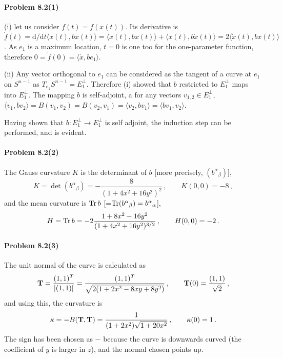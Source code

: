 \documentclass[a4paper,12pt]{article}
\def\d{\mathrm{d}}
\def\Tr{\ensuremath{\mathop{\rm Tr}}}
\newcommand{\problem}[1]{\paragraph{Problem #1}}
\begin{document}

\problem{8.2(1)} (i) let us consider $f(t)=f(x(t))$. Its derivative is $\dot{f}(t) = \d/\d t \langle x(t), b x(t)\rangle = \langle \dot{x}(t), b x(t)\rangle + \langle x(t), b\dot{x}(t)\rangle = 2\langle\dot{x}(t), bx(t)\rangle$. As $e_1$ is a maximum location, $t=0$ is one too for the one-parameter function, therefore $0 = \dot{f}(0) = \langle \dot{x}, be_1\rangle$.

(ii) Any vector orthogonal to $e_1$ can be considered as the tangent of a curve at $e_1$ on $S^{n-1}$ as $T_{e_1}S^{n-1} = E_1^\perp$. Therefore (i) showed that $b$ restricted to $E_1^\perp$ maps into $E_1^\perp$. 
The mapping $b$ is self-adjoint, a for any vectors $v_{1,2}\in E_1^\perp$, $\langle v_1, bv_2\rangle = B(v_1, v_2) = B(v_2, v_1) = \langle v_2, bv_1\rangle = \langle bv_1, v_2\rangle$.

Having shown that $b:E_1^\perp\to E_1^\perp$ is self adjoint, the induction step can be performed, and is evident.


\problem{8.2(2)} The Gauss curvature $K$ is the determinant of $b$ [more precisely, $(b^\alpha{}_\beta)$],
\[
 K = \det (b^\alpha{}_\beta) = -\frac{8}{(1+4x^2+16y^2)^2}\,,\quad\quad K(0, 0) = -8\,,
\]
and the mean curvature is $\Tr b$ [=$\Tr (b^\alpha{}_\beta)=b^\alpha{}_\alpha$],
\[
 H = \Tr b = -2\frac{1+8x^2-16y^2}{(1+4x^2+16y^2)^{3/2}}\,,\quad\quad H(0, 0)= -2\,.
\]


\problem{8.2(3)} The unit normal of the curve is calculated as
\[
 {\bf T} = \frac{(1, 1)^T}{|(1, 1)|} = \frac{(1,1)^T}{\sqrt{2(1+2x^2-8xy+8y^2)}}\,,\quad\quad {\bf T}(0) = \frac{(1, 1)}{\sqrt{2}}\,,
\]
and using this, the curvature is
\[
 \kappa = - B({\bf T}, {\bf T}) = \frac{1}{(1+2x^2)\sqrt{1+20 x^2}}\,,\quad\quad
 \kappa(0) = 1\,.
\]
The sign has been chosen as $-$ because the curve is downwards curved (the coefficient of $y$ is larger in $z$), and the normal chosen points up.

\end{document}
